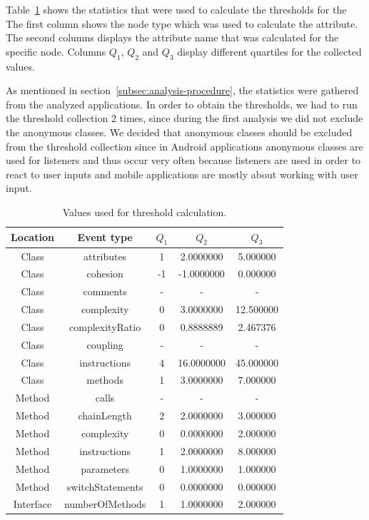 Table~\ref{threshold_calculation_table} shows the statistics that were used to calculate the thresholds for the
The first column shows the node type which was used to calculate the attribute.
The second columns displays the attribute name that was calculated for the specific node.
Columns $Q_1$, $Q_2$ and $Q_3$ display different quartiles for the collected values.

As mentioned in section~\ref{subsec:analysis-procedure}, the statistics were gathered from the analyzed applications.
In order to obtain the thresholds, we had to run the threshold collection 2 times, since during the first analysis
we did not exclude the anonymous classes.
We decided that anonymous classes should be excluded from the threshold collection since in Android applications
anonymous classes are used for listeners and thus occur very often because listeners are used in order to react to
user inputs and mobile applications are mostly about working with user input.

\begin{table}
    \begin{center}
        \begin{tabular} {| c | c | c | c | c |}
            \hline
            \textbf{Location} & \textbf{Event type} & \textbf{$Q_1$} & \textbf{$Q_2$} & \textbf{$Q_3$} \\ \hline
            Class & attributes & 1 & 2.0000000 & 5.000000 \\ \hline
            Class & cohesion & -1 & -1.0000000 & 0.000000  \\ \hline
            Class & comments & - & - & - \\ \hline
            Class & complexity & 0 & 3.0000000 & 12.500000 \\ \hline
            Class & complexityRatio & 0 & 0.8888889 & 2.467376 \\ \hline
            Class & coupling & - & - & - \\ \hline
            Class & instructions & 4 & 16.0000000 & 45.000000 \\ \hline
            Class & methods & 1 & 3.0000000 & 7.000000 \\ \hline
            Method & calls & - & - & - \\ \hline
            Method & chainLength & 2 & 2.0000000 & 3.000000 \\ \hline
            Method & complexity & 0 & 0.0000000 & 2.000000 \\ \hline
            Method & instructions & 1 & 2.0000000 & 8.000000 \\ \hline
            Method & parameters & 0 & 1.0000000 & 1.000000 \\ \hline
            Method & switchStatements & 0 & 0.0000000 & 0.000000 \\ \hline
            Interface & numberOfMethods & 1 & 1.0000000 & 2.000000 \\ \hline
        \end{tabular}
        \caption{\label{threshold_calculation_table}Values used for threshold calculation.}
    \end{center}
\end{table}

